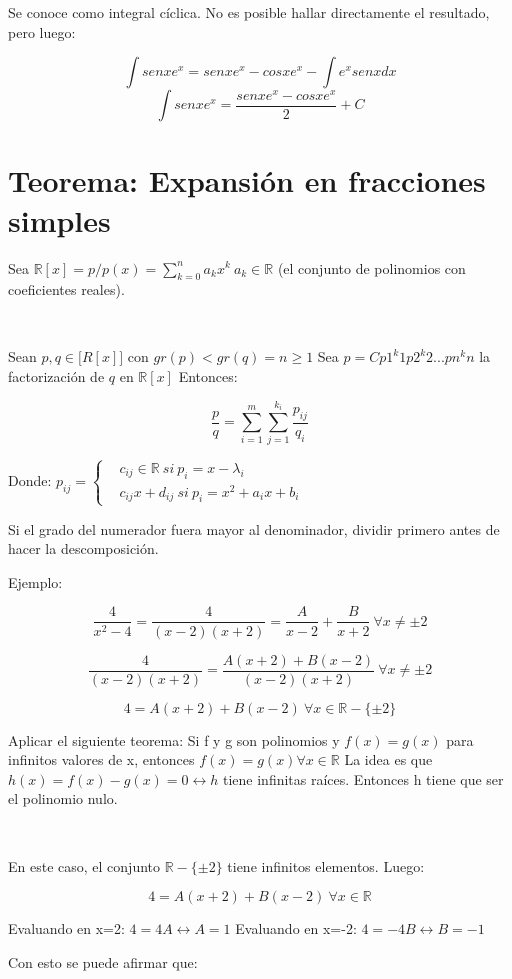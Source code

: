 \documentclass{report}
\begin{document}
		Se conoce como integral cíclica. No es posible hallar directamente el resultado, pero luego:
		
		$$\int senxe^x = senxe^x-cosxe^x-\int e^xsenxdx$$
		$$\int senxe^x = \frac{senxe^x-cosxe^x}{2}+C$$
		
	\section{Teorema: Expansión en fracciones simples}
		Sea $\mathbb{R}[x]=p/p(x)=\sum_{k=0}^{n}a_kx^k \ a_k\in\mathbb{R}$ (el conjunto de polinomios con coeficientes reales).
			
		\
			
		Sean $p,q\in \mathbb[R[x]]$ con $gr(p)<gr(q)=n\geq1$
		Sea $p=Cp1^k1p2^k2...pn^kn$ la factorización de $q$ en $\mathbb{R}[x]$
		Entonces:
			
			$$\frac{p}{q}=\sum_{i=1}^{m}\sum_{j=1}^{k_i}\frac{p_{ij}}{q_i}$$
			
		Donde: $p_{ij}=\begin{cases}
			&c_{ij}\in\mathbb{R} \ si\ p_i=x-\lambda_i \\
			&c_{ij}x+d_{ij} \ si\ p_i=x^2+a_ix+b_i
		\end{cases}$

	Si el grado del numerador fuera mayor al denominador, dividir primero antes de hacer la descomposición.
		
	Ejemplo:
		
	$$\frac{4}{x^2-4}=\frac{4}{(x-2)(x+2)}=\frac{A}{x-2}+\frac{B}{x+2} \ \forall x \neq \pm2$$
		
	$$\frac{4}{(x-2)(x+2)}=\frac{A(x+2)+B(x-2)}{(x-2)(x+2)} \ \forall x \neq \pm2$$
		
	$$4=A(x+2)+B(x-2) \ \forall x \in \mathbb{R}-\{\pm 2\}$$
		
	Aplicar el siguiente teorema: Si f y g son polinomios y $f(x)=g(x)$ para infinitos valores de x, entonces $f(x)=g(x) \forall x \in \mathbb{R}$
	La idea es que $h(x)=f(x)-g(x)=0 \leftrightarrow h$ tiene infinitas raíces.
	Entonces h tiene que ser el polinomio nulo.
		
	\
		
	En este caso, el conjunto $\mathbb{R}-\{\pm 2\}$ tiene infinitos elementos. Luego:
		
	$$4=A(x+2)+B(x-2) \ \forall x \in \mathbb{R}$$
		
	Evaluando en x=2: $4=4A \leftrightarrow A=1$
	Evaluando en x=-2: $4=-4B \leftrightarrow B=-1$
		
	Con esto se puede afirmar que:
		
\end{document}
